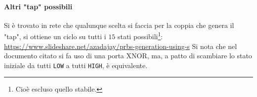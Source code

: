 \documentclass[a4paper,10pt]{article}
\def\code#1{\texttt{#1}}
\begin{document}
\paragraph{Altri "tap" possibili} Si è trovato in rete che qualunque scelta si faccia per la coppia che genera il "tap", si ottiene un ciclo su tutti i $15$ stati possibili\footnote{Cioè escluso quello stabile.}:
\newline
\newline
\href{https://www.slideshare.net/azadajay/prbs-generation-using-s}{https://www.slideshare.net/azadajay/prbs-generation-using-s}
\newline
\newline
Si nota che nel documento citato si fa uso di una porta XNOR, ma, a patto di scambiare lo stato iniziale da tutti \code{LOW} a tutti \code{HIGH}, è equivalente.
\end{document}
